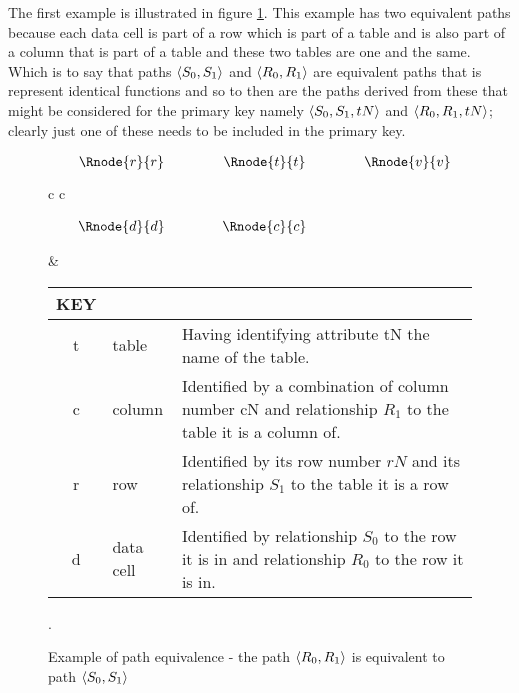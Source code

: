 \documentclass[10pt,a4paper]{article}
\begin{document}
The first example is illustrated in figure
\ref{datatablegraph}. This example has two equivalent paths because 
each data cell is part of a row which is part of a table and is also part 
of a column that is part of a table and these two tables are one and the same.
Which is to say that paths $\langle S_0,S_1\rangle$ and $\langle R_0,R_1\rangle$ are equivalent 
paths that is represent identical functions and so to then are the paths
derived from these that might be considered for the primary key namely
$\langle S_0,S_1,tN\rangle$ and $\langle R_0,R_1,tN\rangle$; clearly just one of these needs
to be included in the primary key. 
\begin{figure} [H] %
\begin{center}
\begin{tabular}{c c}
$
\begin{array}{cp{0.75cm}cp{0.75cm}c}
   \Rnode{r}{r}     & & \Rnode{t}{t} & & \Rnode{v}{v} \\[1.2cm]     
	 \Rnode{d}{d}   & & \Rnode{c}{c} & &               
\end{array}
$
\idcomp
{} 
\idcomp
{} 
\idcomp
{}
\idcomp
{}
\idcomp
{}
\idcomp
{}
\idcomp

& \footnotesize
\begin{tabular}{c p{1.5cm} p{4cm}}
KEY && \\
\hline
t & table & Having identifying attribute tN the name of the table. \\
c & column & Identified by a combination of column number cN and relationship $R_1$ to the table it is a column of.\\
r & row & Identified by its row number $rN$ and its relationship $S_1$ to the table it is a row of.\\
d & data cell & Identified by relationship $S_0$ to the row it is in and relationship $R_0$ to the row it is in. \\
\end{tabular} 
\end{tabular}
\end{center}
\caption{Example of path equivalence - the path $\langle R_0,R_1\rangle$ is equivalent to path $\langle S_0,S_1\rangle$}.
\label{datatablegraph}
\end{figure}
\end{document}

